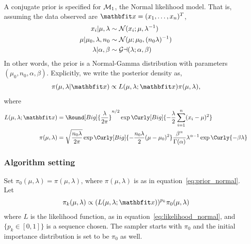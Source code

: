A conjugate prior is specified for $\mathcal{M}_1$, the Normal likelihood model.
That is, assuming the data observed are $\bfx = (x_1,\dots,x_n)^T$,
\begin{align}
  x_i | \mu,\lambda &\sim \mathcal{N}(x_i; \mu, \lambda^{-1}) \\
  \mu | \mu_0,\lambda,n_0 &\sim \mathcal{N}(\mu; \mu_0, (n_0\lambda)^{-1}) \\
  \lambda | \alpha,\beta &\sim \mathcal{Ga}(\lambda; \alpha, \beta)
\end{align}
In other words, the prior is a Normal-Gamma distribution with parameters
$(\mu_0, n_0, \alpha, \beta)$. Explicitly, we write the posterior density
as,
\begin{equation}
  \pi(\mu,\lambda|\bfx) \propto
  L(\mu,\lambda;\bfx)\pi(\mu,\lambda),
  \label{eq:normal_posterior}
\end{equation}
where
\begin{align}
  L(\mu,\lambda;\bfx) &= \Round[Big]{\frac{\lambda}{2\pi}}^{n/2}
  \exp\Curly[Big]{-\frac{\lambda}{2}\sum_{i=1}^n(x_i - \mu)^2}
  \label{eq:likelihood_normal}\\
  \pi(\mu,\lambda) &= \sqrt{\frac{n_0\lambda}{2\pi}}
  \exp\Curly[Big]{-\frac{n_0\lambda}{2}(\mu - \mu_0)^2}
  \frac{\beta^{\alpha}}{\Gamma(\alpha)}
  \lambda^{\alpha - 1}\exp\Curly{-\beta\lambda}
  \label{eq:prior_normal}
\end{align}

\subsubsection{Algorithm setting}

Set $\pi_0(\mu,\lambda) = \pi(\mu,\lambda)$, where $\pi(\mu,\lambda)$ is as in
equation~\ref{eq:prior_normal}. Let
\begin{equation}
  \pi_k(\mu,\lambda) \propto (L(\mu,\lambda;\bfx))^{p_k}\pi_0(\mu,\lambda)
  \label{eq:normal_targets}
\end{equation}
where $L$ is the likelihood function, as in
equation~\eqref{eq:likelihood_normal}, and $\{p_k\in[0,1]\}$ is a sequence
chosen. The \smc sampler starts with $\pi_0$ and the initial importance
distribution is set to be $\pi_0$ as well.

